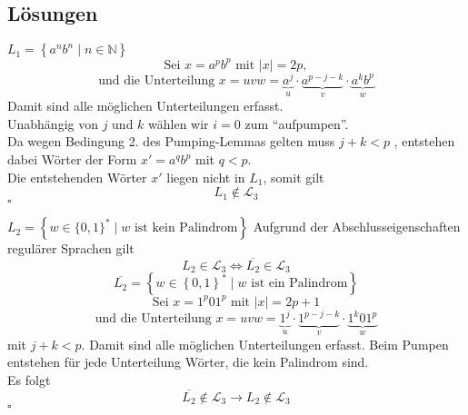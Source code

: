 \documentclass[]{beamer}
\begin{document}
\subsection{Lösungen}
\begin{frame}[squeezue]{}
  \begin{exampleblock}{$L_1 = \left\{a^n b^n \; | \; n \in \mathbb{N} \right\}$}
    \pause
    \[\text{Sei } x = a^p b^p \text{ mit } |x| = 2p,\]
    \pause
    \[\text{und die Unterteilung } x = uvw = \underbrace{a^j}_u \cdot \underbrace{a^{p-j-k}}_v \cdot \underbrace{a^k b^p}_w\]
    \pause
    Damit sind alle möglichen Unterteilungen erfasst. \\
    \pause
    \vspace*{0.5em}
    Unabhängig von $j$ und $k$ wählen wir $i = 0$ zum \enquote{aufpumpen}. \\
    \pause
    \vspace*{0.5em}
    Da wegen Bedingung 2. des Pumping-Lemmas gelten muss $j + k < p$ , entstehen dabei Wörter der Form $x' = a^q b^p$ mit $q < p$. \\
    \pause
    \vspace*{0.5em}
    Die entstehenden Wörter $x'$ liegen nicht in $L_1$, somit gilt
    \[L_1 \notin \mathcal{L}_3\]
    \hfill $\square$
  \end{exampleblock}
\end{frame}

\begin{frame}[squeezue]{}
  \vspace*{-0.25em}
  \begin{exampleblock}{$L_2 = \left\{w \in \{0, 1\}^* \;|\; w \text{ ist kein Palindrom}\right\}$}
    \pause
    Aufgrund der Abschlusseigenschaften regulärer Sprachen gilt
    \[L_2 \in \mathcal{L}_3 \Leftrightarrow \overline{L_2} \in \mathcal{L}_3\]
    \pause
    \vspace*{-0.5em}
    \[\overline{L_2} = \left\{w \in \left\{0, 1\right\}^* \;|\; w \text{ ist ein Palindrom}\right\}\]
    \pause
    \vspace*{-0.5em}
    \[\text{Sei } x = 1^p01^p \text{ mit } |x| = 2p + 1\]
    \pause
    \vspace*{-0.5em}
    \[\text{und die Unterteilung } x = uvw = \underbrace{1^j}_u \cdot \underbrace{1^{p-j-k}}_v \cdot \underbrace{1^k 0 1^p}_w\]
    mit $j + k < p$. Damit sind alle möglichen Unterteilungen erfasst. Beim Pumpen entstehen für jede Unterteilung Wörter, die kein Palindrom sind. \\
    \pause
    \vspace*{1em}
    Es folgt
    \[\overline{L_2} \notin \mathcal{L}_3 \rightarrow L_2 \notin \mathcal{L}_3\]
    \hfill $\square$
  \end{exampleblock}
\end{frame}
\end{document}
